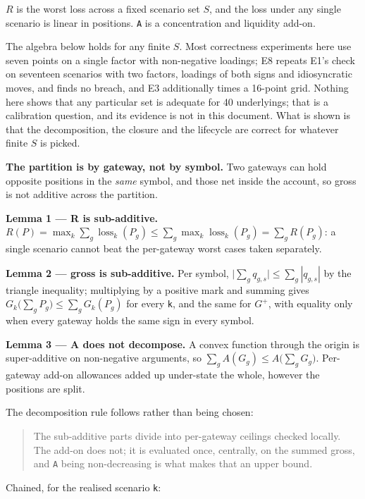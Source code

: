 \documentclass[10pt,a4paper]{article}
\begin{document}
\(R\) is the worst loss across a fixed scenario set \(S\), and the loss under any
single scenario is linear in positions. \texttt{A} is a concentration and liquidity
add-on.

The algebra below holds for any finite \(S\). Most correctness experiments here
use seven points on a single factor with non-negative loadings; E8 repeats E1's
check on seventeen scenarios with two factors, loadings of both signs and
idiosyncratic moves, and finds no breach, and E3 additionally times a 16-point
grid. Nothing here shows that any particular set is adequate for 40 underlyings;
that is a calibration question, and its evidence is not in this document. What
is shown is that the decomposition, the closure and the lifecycle are correct
for whatever finite \(S\) is picked.

\textbf{The partition is by gateway, not by symbol.} Two gateways can hold opposite
positions in the \emph{same} symbol, and those net inside the account, so gross is not
additive across the partition.

\textbf{Lemma 1 --- R is sub-additive.}
\(R(P)=\max_k\sum_g \operatorname{loss}_k(P_g)\le\sum_g\max_k \operatorname{loss}_k(P_g)=\sum_g R(P_g)\): a
single scenario cannot beat the per-gateway worst cases taken separately.

\textbf{Lemma 2 --- gross is sub-additive.} Per symbol,
\(\bigl|\sum_g q_{g,s}\bigr|\le\sum_g |q_{g,s}|\) by the triangle inequality; multiplying by a
positive mark and summing gives \(G_k\bigl(\sum_g P_g\bigr)\le\sum_g G_k(P_g)\) for every \texttt{k},
and the same for \(G^{+}\), with equality only when every gateway holds the same sign
in every symbol.

\textbf{Lemma 3 --- A does not decompose.} A convex function through the origin is
super-additive on non-negative arguments, so \(\sum_g A(G_g)\le A\bigl(\sum_g G_g\bigr)\).
Per-gateway add-on allowances added up under-state the whole, however the
positions are split.

The decomposition rule follows rather than being chosen:

\begin{quote}
The sub-additive parts divide into per-gateway ceilings checked locally. The
add-on does not; it is evaluated once, centrally, on the summed gross, and \texttt{A}
being non-decreasing is what makes that an upper bound.
\end{quote}

Chained, for the realised scenario \texttt{k}:
\end{document}
